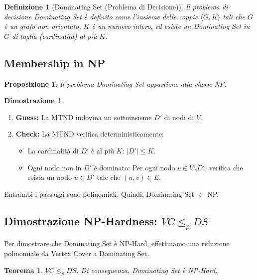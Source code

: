 \documentclass[a4paper]{article}
\newtheorem{theorem}{Teorema}[section]
\newtheorem{definition}{Definizione}[section]
\newtheorem{proposition}{Proposizione}[section]
\theoremstyle{definition} %
\newtheorem*{proof*}{Dimostrazione}
\begin{document}
\begin{definition}[Dominating Set (Problema di Decisione)]
Il problema di decisione \emph{Dominating Set} è definito come l'insieme delle coppie $\langle G, K \rangle$ tali che $G$ è un grafo non orientato, $K$ è un numero intero, ed esiste un Dominating Set in $G$ di taglia (cardinalità) al più $K$.
\end{definition}

\subsection{Membership in NP}

\begin{proposition}
Il problema \emph{Dominating Set} appartiene alla classe NP.
\end{proposition}

\begin{proof*}
\begin{enumerate}
    \item \textbf{Guess:} La MTND indovina un sottoinsieme $D'$ di nodi di $V$.
    \item \textbf{Check:} La MTND verifica deterministicamente:
    \begin{itemize}
        \item La cardinalità di $D'$ è al più $K$: $|D'| \le K$.
        \item Ogni nodo non in $D'$ è dominato: Per ogni nodo $v \in V \setminus D'$, verifica che esista un nodo $u \in D'$ tale che $(u, v) \in E$.
    \end{itemize}
\end{enumerate}
Entrambi i passaggi sono polinomiali. Quindi, Dominating Set $\in$ NP.
\end{proof*}

\subsection{Dimostrazione NP-Hardness: $VC \le_p DS$}

Per dimostrare che Dominating Set è NP-Hard, effettuiamo una riduzione polinomiale da Vertex Cover a Dominating Set.

\begin{theorem}
$VC \le_p DS$. Di conseguenza, \emph{Dominating Set} è NP-Hard.
\end{theorem}
\end{document}
